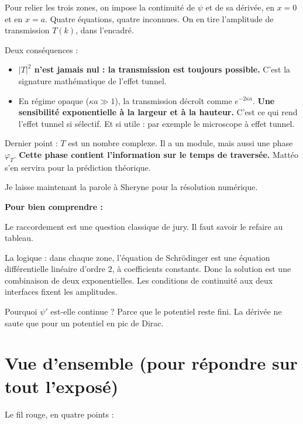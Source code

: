\documentclass[12pt,a4paper]{article}
\newenvironment{comprendre}%
  {\par\medskip\noindent\hrulefill\par\nopagebreak\textbf{Pour bien comprendre :}\par}%
  {\par\nopagebreak\noindent\hrulefill\par\medskip}
\begin{document}
Pour relier les trois zones, on impose la continuité de $\psi$
et de sa dérivée, en $x = 0$ et en $x = a$.
Quatre équations, quatre inconnues.
On en tire l'amplitude de transmission $T(k)$, dans l'encadré.

Deux conséquences :

\begin{itemize}
\item \textbf{$|T|^2$ n'est jamais nul : la transmission est toujours
      possible.} C'est la signature mathématique de l'effet tunnel.
\item En régime opaque ($\kappa a \gg 1$), la transmission décroît
      comme $e^{-2\kappa a}$.
      \textbf{Une sensibilité exponentielle à la largeur et à la hauteur.}
      C'est ce qui rend l'effet tunnel si sélectif.
      Et si utile : par exemple le microscope à effet tunnel.
\end{itemize}

Dernier point : $T$ est un nombre complexe.
Il a un module, mais aussi une phase $\varphi_T$.
\textbf{Cette phase contient l'information sur le temps de traversée.}
Mattéo s'en servira pour la prédiction théorique.

Je laisse maintenant la parole à Sheryne pour la résolution numérique.

\begin{comprendre}
Le raccordement est une question classique de jury.
Il faut savoir le refaire au tableau.

La logique :
dans chaque zone, l'équation de Schrödinger est une équation
différentielle linéaire d'ordre 2, à coefficients constants.
Donc la solution est une combinaison de deux exponentielles.
Les conditions de continuité aux deux interfaces fixent les amplitudes.

Pourquoi $\psi'$ est-elle continue ?
Parce que le potentiel reste fini.
La dérivée ne saute que pour un potentiel en pic de Dirac.
\end{comprendre}

\clearpage
\section*{Vue d'ensemble (pour répondre sur tout l'exposé)}

Le fil rouge, en quatre points :
\end{document}
